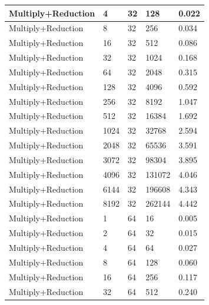 \documentclass{article}
\begin{document}
\begin{longtable}{|l|l|l|l|l|}
Multiply+Reduction & 4    & 32          & 128               & 0.022             \\ \hline
Multiply+Reduction & 8    & 32          & 256               & 0.034             \\ \hline
Multiply+Reduction & 16   & 32          & 512               & 0.086             \\ \hline
Multiply+Reduction & 32   & 32          & 1024              & 0.168             \\ \hline
Multiply+Reduction & 64   & 32          & 2048              & 0.315             \\ \hline
Multiply+Reduction & 128  & 32          & 4096              & 0.592             \\ \hline
Multiply+Reduction & 256  & 32          & 8192              & 1.047             \\ \hline
Multiply+Reduction & 512  & 32          & 16384             & 1.692             \\ \hline
Multiply+Reduction & 1024 & 32          & 32768             & 2.594             \\ \hline
Multiply+Reduction & 2048 & 32          & 65536             & 3.591             \\ \hline
Multiply+Reduction & 3072 & 32          & 98304             & 3.895             \\ \hline
Multiply+Reduction & 4096 & 32          & 131072            & 4.046             \\ \hline
Multiply+Reduction & 6144 & 32          & 196608            & 4.343             \\ \hline
Multiply+Reduction & 8192 & 32          & 262144            & 4.442             \\ \hline
Multiply+Reduction & 1    & 64          & 16                & 0.005             \\ \hline
Multiply+Reduction & 2    & 64          & 32                & 0.015             \\ \hline
Multiply+Reduction & 4    & 64          & 64                & 0.027             \\ \hline
Multiply+Reduction & 8    & 64          & 128               & 0.060             \\ \hline
Multiply+Reduction & 16   & 64          & 256               & 0.117             \\ \hline
Multiply+Reduction & 32   & 64          & 512               & 0.240             \\ \hline

\end{longtable}
\end{document}
